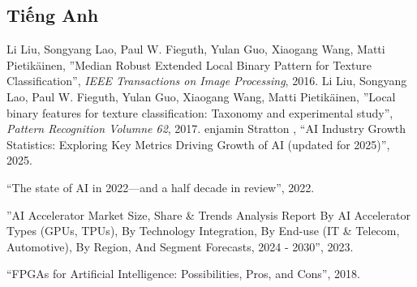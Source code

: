 \documentclass[a4paper,12pt,oneside]{book}%
\renewcommand{\baselinestretch}{1.4}
\begin{document}
\def\baselinestretch{1}
\vspace{-2cm}
\renewcommand{\bibname}{Tài liệu tham khảo}
\clearpage
{}
{}
\renewcommand{\refname}{Literary works}
\begin{thebibliography}{xx}
	\section*{Tiếng Anh}	
	Li Liu, Songyang Lao, Paul W. Fieguth, Yulan Guo, Xiaogang Wang, Matti Pietikäinen, ''Median Robust Extended Local Binary Pattern for Texture Classification'', {\em IEEE Transactions on Image Processing}, 2016.
	Li Liu, Songyang Lao, Paul W. Fieguth, Yulan Guo, Xiaogang Wang, Matti Pietikäinen, ''Local binary features for texture classification: Taxonomy and experimental study'', {\em Pattern Recognition Volumne 62}, 2017.
	enjamin Stratton  , ``AI Industry Growth Statistics: Exploring Key Metrics Driving Growth of AI (updated for 2025)'', 2025.
	
	``The state of AI in 2022—and a half decade in review'', 2022.
	
	''AI Accelerator Market Size, Share \& Trends Analysis Report By AI Accelerator Types (GPUs, TPUs), By Technology Integration, By End-use (IT \& Telecom, Automotive), By Region, And Segment Forecasts, 2024 - 2030'', 2023.
	
	``FPGAs for Artificial Intelligence: Possibilities, Pros, and Cons'', 2018.
	
	
	

\end{thebibliography}
\end{document}
